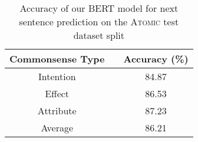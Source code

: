 \begin{table}[t]
    \centering
    \small
    \begin{tabular}{c c c}
        \toprule
        \textbf{Commonsense Type} & \phantom{abc} & \textbf{Accuracy (\%)}  \\
        \toprule
        Intention   && 84.87  \\
        Effect      && 86.53  \\
        Attribute   && 87.23  \\
        \midrule
        Average     && 86.21  \\
        \bottomrule
    \end{tabular}
    \caption{Accuracy of our BERT model for next sentence prediction on the A\textsc{tomic} test dataset split}
    \label{tab:bert}
\end{table}